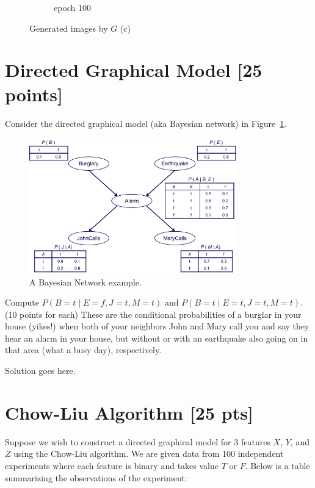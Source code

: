 \documentclass[a4paper]{article}
\theoremstyle{definition}
\newenvironment{soln}{
	\leavevmode\color{blue}\ignorespaces
}{}
\begin{document}
\begin{enumerate} [label=(\alph*)]
\begin{soln}
\begin{figure}[H]
\begin{subfigure}[b]{0.3\textwidth}
				      \caption{epoch 100}
			      \end{subfigure}
			      \caption*{Generated images by $G$ (c)}
		      \end{figure}
	      \end{soln}

\end{enumerate}

\section{Directed Graphical Model [25 points]}
Consider the directed graphical model (aka Bayesian network) in Figure~\ref{fig:bn}.
\begin{figure}[H]
	\centering
	\includegraphics[width=0.8\textwidth]{BN.jpeg}
	\caption{A Bayesian Network example.}
	\label{fig:bn}
\end{figure}
Compute $P(B=t \mid E=f,J=t,M=t)$ and $P(B=t \mid E=t,J=t,M=t)$. (10 points for each) These are the conditional probabilities of a burglar in your house (yikes!) when both of your neighbors John and Mary call you and say they hear an alarm in your house, but without or with an earthquake also going on in that area (what a busy day), respectively.

\begin{soln}  Solution goes here. \end{soln}


\section{Chow-Liu Algorithm [25 pts]}
Suppose we wish to construct a directed graphical model for 3 features $X$, $Y$, and $Z$ using the Chow-Liu algorithm. We are given data from 100 independent experiments where each feature is binary and takes value $T$ or $F$. Below is a table summarizing the observations of the experiment:
\end{document}
